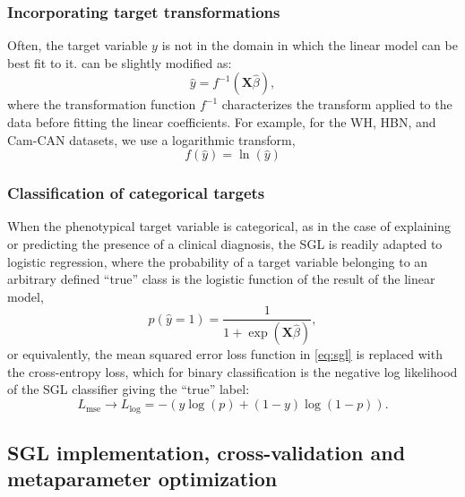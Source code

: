\documentclass[10pt,letterpaper]{article}
\begin{document}
\subsubsection*{Incorporating target transformations}

Often, the target variable $y$ is not in the domain in which the linear
model can be best fit to it.  can be slightly
modified as:
\begin{equation}
    \hat{y} = f^{-1} \left( \mathbf{X} \hat{\beta} \right),
    \label{eq:lm-transform}
\end{equation}
where the transformation function $f^{-1}$ characterizes the transform
applied to the data before fitting the linear coefficients. For example,
for the WH, HBN, and Cam-CAN datasets, we use a logarithmic transform,
\begin{equation}
    f \left( \hat{y} \right) = \ln \left( \hat{y} \right)
    \label{eq:log-nonlinearity}
\end{equation}

\subsubsection*{Classification of categorical targets}

When the phenotypical target variable is categorical, as in the case of
explaining or predicting the presence of a clinical diagnosis, the SGL is
readily adapted to logistic regression, where the probability of a target
variable belonging to an arbitrary defined ``true'' class is the logistic
function of the result of the linear model,
\begin{equation}
    p(\hat{y} = 1) = \frac{1}{1 + \exp(\mathbf{X} \hat{\beta})},
    \label{eq:logit}
\end{equation}
or equivalently, the mean squared error loss function in \cref{eq:sgl} is
replaced with the cross-entropy loss, which for binary classification is the
negative log likelihood of the SGL classifier giving the ``true'' label:
\begin{equation}
    L_{\text{mse}} \rightarrow L_{\log} =
    -\left(y \log(p) + (1 - y) \log(1 - p)\right).
    \label{eq:logloss}
\end{equation}

\subsection*{SGL implementation, cross-validation and metaparameter optimization}
\end{document}
